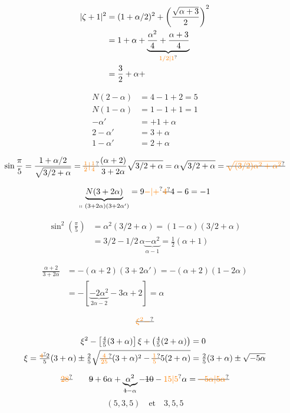 \[
\begin{aligned}
 |\zeta+1|^2&=(1+\alpha/2)^2+\left(\frac{\sqrt{\alpha+3}}2\right)^2\\
 &=1+\alpha+\underbrace{\frac{\alpha^2}4+\frac{\alpha+3}4}_{\unsure{1/2|1}}\\
 &=\frac32+\alpha+
\end{aligned}
\]

\[
\begin{aligned}
N(2-\alpha)&=4-1+2=5\\
N(1-\alpha)&=1-1+1=1\\
-\alpha'&=+1+\alpha\\
2-\alpha'&=3+\alpha\\
1-\alpha'&=2+\alpha
\end{aligned}
\]

\[
 \sin\frac{\pi}{5}=\frac{1+\alpha/2}{\sqrt{3/2+\alpha}}
 =\deleted{\unsure{\tfrac12|\tfrac14}}\frac{(\alpha+2)}{3+2\alpha}\sqrt{3/2+\alpha}
 =\alpha\sqrt{3/2+\alpha}=\deleted{\unsure{\sqrt{(3/2)\alpha^2+\alpha^2}}}
\]

\[
 \underbrace{N(3+2\alpha)}_{\shortparallel\ (3+2\alpha)(3+2\alpha')}=9\unsure{-|+}\deleted{\unsure{4}}4-6=-1
\]

\[
\begin{aligned}
 \sin^2\left(\frac{\pi}{5}\right)&=\alpha^2(3/2+\alpha)=(1-\alpha)(3/2+\alpha)\\
 &=3/2-1/2\,\alpha\underbrace{-\alpha^2}_{\alpha-1}=\tfrac12(\alpha+1)
\end{aligned}
\]

\[
\begin{aligned}
 \frac{\alpha+2}{3+2\alpha}&=-(\alpha+2)(3+2\alpha')=-(\alpha+2)(1-2\alpha)\\
 &=-[\underbrace{-2\alpha^2}_{2\alpha-2}-3\alpha+2]=\alpha
\end{aligned}
\]

\[
 \deleted{\unsure{\xi^2-}}
\]

\[
\begin{aligned}
 \xi^2-\left[\tfrac45(3+\alpha)\right]\xi+\left(\tfrac45(2+\alpha)\right)&=0\\
 \xi=\tfrac{\deleted{\unsure{4}}2}{5}(3+\alpha)
 \mathbin{\pm}\tfrac25\sqrt{\deleted{\unsure{\tfrac4{25}}}(3+\alpha)^2-
 \deleted{\unsure{\tfrac15}}5(2+\alpha)}
 &=\tfrac25(3+\alpha)\mathbin{\pm}\sqrt{-5\alpha}
\end{aligned}
\]

\[
 \deleted{\unsure{28}}\qquad
 \deleted{9}+6\alpha+\underbrace{\alpha^2}_{\deleted{1}-\alpha}-\deleted{10}
 -\unsure{15|5}\alpha=\deleted{\unsure{-5\alpha|5\alpha}}
\]
\[
 \boxed{(5,3,5)}\quad\text{et}\quad\boxed{3,5,5}
\]

